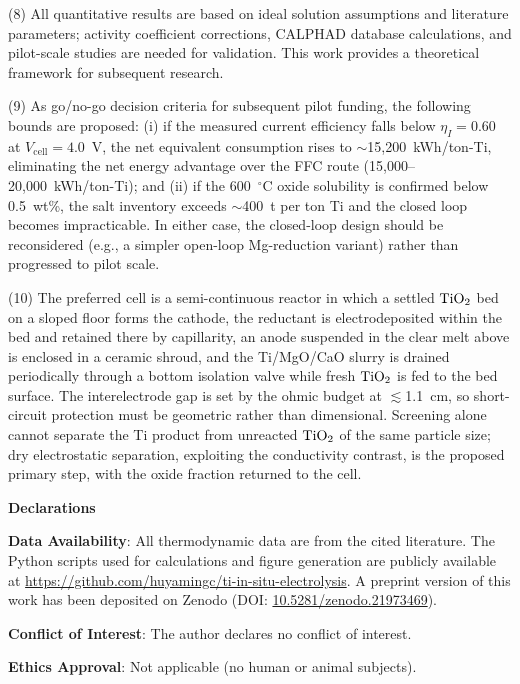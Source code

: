 \documentclass[11pt]{article}
\begin{document}
(8) All quantitative results are based on ideal solution assumptions and literature parameters; activity coefficient corrections, CALPHAD database calculations, and pilot-scale studies are needed for validation. This work provides a theoretical framework for subsequent research.

(9) As go/no-go decision criteria for subsequent pilot funding, the following bounds are proposed: (i) if the measured current efficiency falls below $\eta_I = 0.60$ at $V_{\mathrm{cell}} = 4.0$~V, the net equivalent consumption rises to $\sim$15{,}200~kWh/ton-Ti, eliminating the net energy advantage over the FFC route (15{,}000--20{,}000~kWh/ton-Ti); and (ii) if the 600~$^{\circ}$C oxide solubility is confirmed below 0.5~wt\%, the salt inventory exceeds $\sim$400~t per ton Ti and the closed loop becomes impracticable. In either case, the closed-loop design should be reconsidered (e.g., a simpler open-loop Mg-reduction variant) rather than progressed to pilot scale.

(10) The preferred cell is a semi-continuous reactor in which a settled $\ce{TiO2}$ bed on a sloped floor forms the cathode, the reductant is electrodeposited within the bed and retained there by capillarity, an anode suspended in the clear melt above is enclosed in a ceramic shroud, and the Ti/MgO/CaO slurry is drained periodically through a bottom isolation valve while fresh $\ce{TiO2}$ is fed to the bed surface. The interelectrode gap is set by the ohmic budget at $\lesssim$1.1~cm, so short-circuit protection must be geometric rather than dimensional. Screening alone cannot separate the Ti product from unreacted $\ce{TiO2}$ of the same particle size; dry electrostatic separation, exploiting the conductivity contrast, is the proposed primary step, with the oxide fraction returned to the cell.

\noindent\textbf{Declarations}

\noindent\textbf{Data Availability}: All thermodynamic data are from the cited literature. The Python scripts used for calculations and figure generation are publicly available at \url{https://github.com/huyamingc/ti-in-situ-electrolysis}. A preprint version of this work has been deposited on Zenodo (DOI: \href{https://doi.org/10.5281/zenodo.21973469}{10.5281/zenodo.21973469}).

\noindent\textbf{Conflict of Interest}: The author declares no conflict of interest.

\noindent\textbf{Ethics Approval}: Not applicable (no human or animal subjects).
\end{document}

